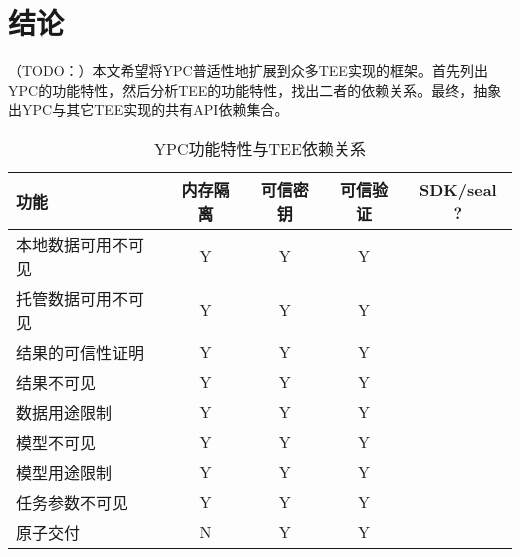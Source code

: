 \chapter{结论}

（TODO：）本文希望将YPC普适性地扩展到众多TEE实现的框架。首先列出YPC的功能特性，然后分析TEE的功能特性，找出二者的依赖关系。最终，抽象出YPC与其它TEE实现的共有API依赖集合。

\begin{table*}[!htbp]
    \centering
    \begin{tabular}{lcccc}
    \toprule
    \textbf{功能} & \textbf{内存隔离} & \textbf{可信密钥} & \textbf{可信验证} & \textbf{SDK/seal ?} \\ \hline
    本地数据可用不可见 & Y & Y & Y \\
    托管数据可用不可见 & Y & Y & Y \\
    结果的可信性证明 & Y & Y & Y \\
    结果不可见 & Y & Y & Y \\
    数据用途限制 & Y & Y & Y \\
    模型不可见 & Y & Y & Y \\
    模型用途限制 & Y & Y & Y \\
    任务参数不可见 & Y & Y & Y \\
    原子交付 & N & Y & Y \\
    \bottomrule
    \end{tabular}
    \caption{YPC功能特性与TEE依赖关系}
    \label{tab:scale-sol-comp}
\end{table*}
